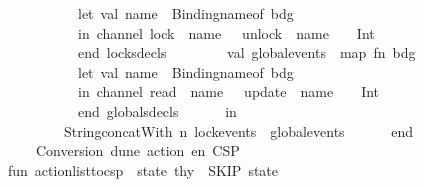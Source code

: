 \begin{isabellebody}
\ \ \ \ \ \ \ \ \ \ let\ val\ name\ {\isacharequal}{\kern0pt}\ Binding{\isachardot}{\kern0pt}name{\isacharunderscore}{\kern0pt}of\ bdg\isanewline
\ \ \ \ \ \ \ \ \ \ in\ {\isachardoublequote}{\kern0pt}channel\ lock{\isacharunderscore}{\kern0pt}{\isachardoublequote}{\kern0pt}\ {\isacharcircum}{\kern0pt}\ name\ {\isacharcircum}{\kern0pt}\ {\isachardoublequote}{\kern0pt}{\isacharcomma}{\kern0pt}\ unlock{\isacharunderscore}{\kern0pt}{\isachardoublequote}{\kern0pt}\ {\isacharcircum}{\kern0pt}\ name\ {\isacharcircum}{\kern0pt}\ {\isachardoublequote}{\kern0pt}\ {\isacharcolon}{\kern0pt}\ Int{\isachardoublequote}{\kern0pt}\isanewline
\ \ \ \ \ \ \ \ \ \ end{\isacharparenright}{\kern0pt}\ locks{\isacharunderscore}{\kern0pt}decls\isanewline
\isanewline
\ \ \ \ \ \ \ \ val\ global{\isacharunderscore}{\kern0pt}events\ {\isacharequal}{\kern0pt}\ map\ {\isacharparenleft}{\kern0pt}fn\ {\isacharparenleft}{\kern0pt}bdg{\isacharcomma}{\kern0pt}\ {\isacharunderscore}{\kern0pt}{\isacharcomma}{\kern0pt}\ {\isacharunderscore}{\kern0pt}{\isacharcomma}{\kern0pt}\ {\isacharunderscore}{\kern0pt}{\isacharparenright}{\kern0pt}\ {\isacharequal}{\kern0pt}{\isachargreater}{\kern0pt}\isanewline
\ \ \ \ \ \ \ \ \ \ let\ val\ name\ {\isacharequal}{\kern0pt}\ Binding{\isachardot}{\kern0pt}name{\isacharunderscore}{\kern0pt}of\ bdg\ \ \isanewline
\ \ \ \ \ \ \ \ \ \ in\ {\isachardoublequote}{\kern0pt}channel\ read{\isacharunderscore}{\kern0pt}{\isachardoublequote}{\kern0pt}\ {\isacharcircum}{\kern0pt}\ name\ {\isacharcircum}{\kern0pt}\ {\isachardoublequote}{\kern0pt}{\isacharcomma}{\kern0pt}\ update{\isacharunderscore}{\kern0pt}{\isachardoublequote}{\kern0pt}\ {\isacharcircum}{\kern0pt}\ name\ {\isacharcircum}{\kern0pt}\ {\isachardoublequote}{\kern0pt}\ {\isacharcolon}{\kern0pt}\ Int{\isachardoublequote}{\kern0pt}\isanewline
\ \ \ \ \ \ \ \ \ \ end{\isacharparenright}{\kern0pt}\ globals{\isacharunderscore}{\kern0pt}decls\isanewline
\ \ \ \ \ \ in\isanewline
\ \ \ \ \ \ \ \ String{\isachardot}{\kern0pt}concatWith\ {\isachardoublequote}{\kern0pt}{\isacharbackslash}{\kern0pt}n{\isachardoublequote}{\kern0pt}\ {\isacharparenleft}{\kern0pt}lock{\isacharunderscore}{\kern0pt}events\ {\isacharat}{\kern0pt}\ global{\isacharunderscore}{\kern0pt}events{\isacharparenright}{\kern0pt}\isanewline
\ \ \ \ \ \ end\isanewline
\isanewline
\ \ \ \ {\isacharparenleft}{\kern0pt}{\isacharasterisk}{\kern0pt}Conversion\ d{\isacharprime}{\kern0pt}une\ action\ en\ CSP\ {\isacharasterisk}{\kern0pt}{\isacharparenright}{\kern0pt}\isanewline
fun\ action{\isacharunderscore}{\kern0pt}list{\isacharunderscore}{\kern0pt}to{\isacharunderscore}{\kern0pt}csp\ {\isacharbrackleft}{\kern0pt}{\isacharbrackright}{\kern0pt}\ state\ thy\ {\isacharequal}{\kern0pt}\ {\isacharparenleft}{\kern0pt}{\isachardoublequote}{\kern0pt}SKIP{\isachardoublequote}{\kern0pt}{\isacharcomma}{\kern0pt}\ state{\isacharparenright}{\kern0pt}\isanewline

\end{isabellebody}
